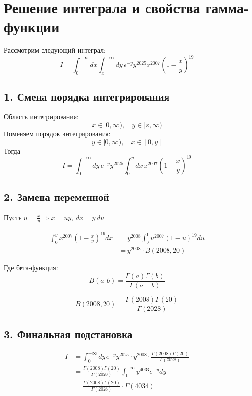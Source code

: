 \documentclass{article}
\begin{document}
\section*{Решение интеграла и свойства гамма-функции}

Рассмотрим следующий интеграл:
\[
I = \int_0^{+\infty} dx \int_x^{+\infty} dy\, e^{-y} y^{2025} x^{2007} \left(1 - \frac{x}{y} \right)^{19}
\]

\subsection*{1. Смена порядка интегрирования}

Область интегрирования:
\[
x \in [0, \infty), \quad y \in [x, \infty)
\]
Поменяем порядок интегрирования:
\[
y \in [0, \infty), \quad x \in [0, y]
\]
Тогда:
\[
I = \int_0^{+\infty} dy\, e^{-y} y^{2025} \int_0^y dx\, x^{2007} \left(1 - \frac{x}{y} \right)^{19}
\]

\subsection*{2. Замена переменной}

Пусть \( u = \frac{x}{y} \Rightarrow x = uy, \, dx = y\, du \)

\begin{align*}
\int_0^y x^{2007} \left(1 - \frac{x}{y} \right)^{19} dx
&= y^{2008} \int_0^1 u^{2007} (1 - u)^{19} du \\
&= y^{2008} \cdot B(2008, 20)
\end{align*}

Где бета-функция:
\[
B(a, b) = \frac{\Gamma(a)\Gamma(b)}{\Gamma(a + b)}
\]

\[
B(2008, 20) = \frac{\Gamma(2008)\Gamma(20)}{\Gamma(2028)}
\]

\subsection*{3. Финальная подстановка}

\begin{align*}
I &= \int_0^{+\infty} dy\, e^{-y} y^{2025} \cdot y^{2008} \cdot \frac{\Gamma(2008)\Gamma(20)}{\Gamma(2028)} \\
&= \frac{\Gamma(2008)\Gamma(20)}{\Gamma(2028)} \int_0^{+\infty} y^{4033} e^{-y} dy \\
&= \frac{\Gamma(2008)\Gamma(20)}{\Gamma(2028)} \cdot \Gamma(4034)
\end{align*}
\end{document}
